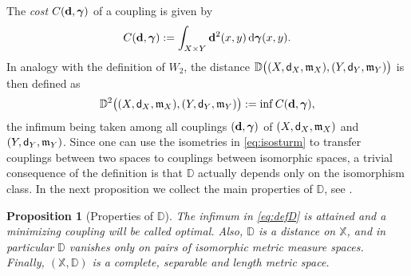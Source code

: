 \documentclass[reqno,11pt]{article}
\numberwithin{equation}{section}
\newcommand{\D}{\mathbb{D}}
\newcommand{\mm}{{\mbox{\boldmath$m$}}}
\newcommand{\ggamma}{{\mbox{\boldmath$\gamma$}}}
\newcommand{\sfd}{{\sf d}}
\renewcommand{\d}{{\mathrm d}}
\newtheorem{proposition}[theorem]{Proposition}
\newcommand{\X}{\mathbb X}
\renewcommand{\mm}{\mathfrak m}
\begin{document}
The \emph{cost} $C({\bf d},\ggamma)$ of a coupling is given by
\[
C({\bf d},\ggamma):=\int_{X\times Y} {\bf d}^2(x,y)\,\d\ggamma(x,y).
\]
In analogy with the definition of $W_2$, the distance
$\D\big((X,\sfd_X,\mm_X),(Y,\sfd_Y,\mm_Y)\big)$ is then defined as
\begin{equation}
\label{eq:defD}
\D^2\bigl((X,\sfd_X,\mm_X),(Y,\sfd_Y,\mm_Y)\bigr):=\inf C({\bf
d},\ggamma),
\end{equation}
the infimum being taken among all couplings $({\bf d},\ggamma)$ of
$(X,\sfd_X,\mm_X)$ and $(Y,\sfd_Y,\mm_Y)$.
%
Since one can use the isometries in \eqref{eq:isosturm} to transfer
couplings between two spaces to couplings between isomorphic spaces,
a trivial consequence of the definition is that $\D$ actually
depends only on the isomorphism class. In the next proposition we
collect the main properties of $\D$, see
\cite[Section~3.1]{Sturm06I}.

\begin{proposition}[Properties of $\D$]
The infimum in \eqref{eq:defD} is attained and a minimizing coupling
will be called optimal. Also, $\D$ is a distance on $\X$, and in
particular $\D$ vanishes only on pairs of isomorphic metric measure
spaces.\\
Finally, $(\X,\D)$ is a complete, separable and length metric space.
\end{proposition}
\end{document}
